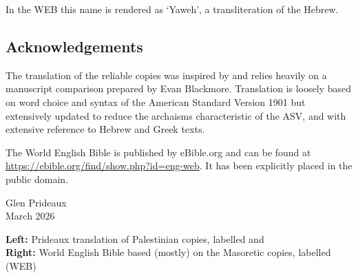 {In the WEB this name is rendered as `Yaweh', a transliteration of the
Hebrew.

\subsection*{Acknowledgements}

The translation of the reliable copies was inspired by and relies heavily on a manuscript comparison
prepared by Evan Blackmore. Translation is loosely based on word choice
and syntax of the American Standard Version 1901 but extensively updated
to reduce the archaisms characteristic of the ASV, and with extensive
reference to Hebrew and Greek texts.

The World English Bible is published by eBible.org and can be found at
\href{https://ebible.org/find/show.php?id=eng-web}{https://ebible.org/find/show.php?id=eng-web}. It
has been explicitly placed in the public domain.

} %

\bigskip
\noindent Glen Prideaux\\
March 2026

\bigskip
\noindent\textbf{Left:} Prideaux translation of Palestinian copies,
labelled  and\\
\textbf{Right:} World English Bible based (mostly) on the Masoretic copies,
labelled {\small (WEB)}